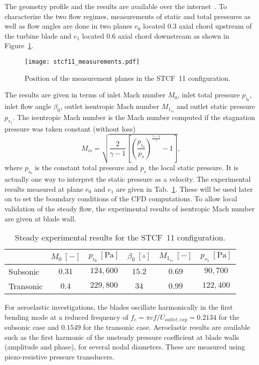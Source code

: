 The geometry profile and the results are available over the
internet~\cite{stcf11web}. 
To characterize the two flow regimes, measurements of static and total pressures 
as well as flow angles are done in two planes $e_0$ located $0.3$ axial chord upstream 
of the turbine
blade and $e_1$ located $0.6$ axial chord downstream
as shown in Figure~\ref{fig:stcf11_measurements}.
\begin{figure}[htp]
  \centering
  \texttt{[image: stcf11\_measurements.pdf]}
  \caption{Position of the measurement planes in the STCF~11 configuration.}
  \label{fig:stcf11_measurements}
\end{figure}
The results are given in terms of
inlet Mach number $M_0$, inlet total pressure $p_{i_0}$, 
inlet flow angle $\beta_0$, outlet isentropic
Mach number $M_{1_{is}}$ and outlet static pressure $p_{s_1}$. 
The isentropic Mach number is the Mach number 
computed if the stagnation pressure was taken constant (without loss)
\begin{equation}
    M_{is} = \sqrt{\frac{2}{\gamma -1}
        \left[\left( \frac{p_{i_0}}{p_s} \right)^{\frac{\gamma - 1}{\gamma}}  
        - 1 \right]},
\end{equation}
where $p_{i_0}$ is the constant total pressure and $p_s$
the local static pressure.
It is actually
one way to interpret the static pressure as a velocity.
The experimental results measured at plane $e_0$
and $e_1$ are given in Tab.~\ref{tab:stcf11_steady_results}. 
These will be used later on to set the boundary conditions 
of the CFD computations. To allow local validation of the steady
flow, the experimental results of 
isentropic Mach number are given at blade wall.
\begin{table}[htp]
   \centering
  \begin{tabular}{lccccc}
    \toprule
    \phantom{abdefghijk}& $M_0~[-]$ & $p_{i_0}~[\text{Pa}]$ & $\beta_0~[\circ]$ & $M_{1_{is}}~[-]$ & $p_{s_1}~[\text{Pa}]$ \\
    \midrule
    Subsonic & $0.31$ & $124,600$ & $15.2$ & $0.69$  & $90,700$ \\
    Transonic & $0.4$ & $229,800$ & $34$    & $0.99$ & $122,400$ \\
    \bottomrule
  \end{tabular}
  \caption{Steady experimental results for the STCF~11 configuration.}
  \label{tab:stcf11_steady_results}
\end{table} 

For aeroelastic investigations, the blades oscillate harmonically in the first bending mode
at a reduced frequency of $f_{c} =\pi c f/U_{outlet, exp} = 0.2134$ 
for the subsonic case and $0.1549$ for the
transonic case. Aeroelastic
results are available such as the first harmonic of the unsteady pressure
coefficient at blade walls (amplitude and phase), for several nodal
diameters. These are measured using piezo-resistive pressure transducers.

